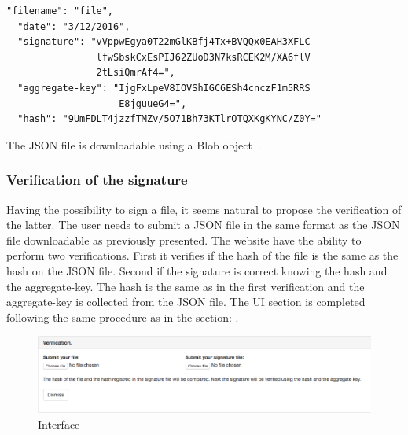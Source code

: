\documentclass[11pt, a4paper, twoside, openright, openany]{article}
\begin{document}
\begin{lstlisting}[caption={Example a downloadable JSON file}, captionpos=b]
  "filename": "file",
  "date": "3/12/2016",
  "signature": "vVppwEgya0T22mGlKBfj4Tx+BVQQx0EAH3XFLC
                lfwSbskCxEsPIJ62ZUoD3N7ksRCEK2M/XA6flV
                2tLsiQmrAf4=",
  "aggregate-key": "IjgFxLpeV8IOVShIGC6ESh4cnczF1m5RRS
                    E8jguueG4=",
  "hash": "9UmFDLT4jzzfTMZv/5O71Bh73KTlrOTQXKgKYNC/Z0Y="
\end{lstlisting}

The JSON file is downloadable using a Blob object~\cite{blob}.
\bigbreak

\subsubsection{Verification of the signature}
Having the possibility to sign a file, it seems natural to propose the verification of the latter.
\newline
The user needs to submit a JSON file in the same format as the JSON file downloadable
as previously presented. The website have the ability to perform two verifications.
\newline
First it verifies if the hash of the file is the same as the hash on the JSON file. Second if the signature
is correct knowing the hash and the aggregate-key. The hash is the same as in the first verification
and the aggregate-key is collected from the JSON file.
\newline \newline
The UI section is completed following the same procedure as in the section: .
\newline

\begin{figure}[ht!]
\centering
\includegraphics[width=125mm]{verification_verification.jpg}
\caption{Interface}
\end{figure}
\end{document}
